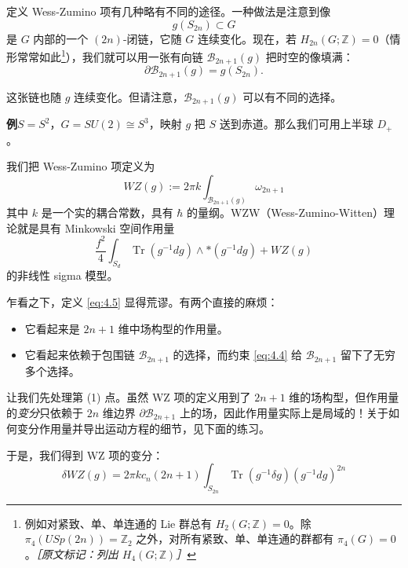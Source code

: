 定义 Wess-Zumino 项有几种略有不同的途径。一种做法是注意到像
\begin{equation}
  g(S_{2n})\subset G
  \tag{4.3}
  \label{eq:4.3}
\end{equation}
是 $G$ 内部的一个 $(2n)$-闭链，它随 $G$ 连续变化。现在，若 $H_{2n}(G;\mathbb{Z})=0$（情形常常如此\footnote{例如对紧致、单、单连通的 Lie 群总有 $H_2(G;\mathbb{Z})=0$。除 $\pi_4(USp(2n))=\mathbb{Z}_2$ 之外，对所有紧致、单、单连通的群都有 $\pi_4(G)=0$。{\small\itshape ［原文标记：列出 $H_4(G;\mathbb{Z})$］}}），我们就可以用一张有向链 $\mathcal{B}_{2n+1}(g)$ 把时空的像填满：
\begin{equation}
  \partial\mathcal{B}_{2n+1}(g)=g(S_{2n}).
  \tag{4.4}
  \label{eq:4.4}
\end{equation}

这张链也随 $g$ 连续变化。但请注意，$\mathcal{B}_{2n+1}(g)$ 可以有不同的选择。

\textbf{例}\quad $S=S^2$，$G=SU(2)\cong S^3$，映射 $g$ 把 $S$ 送到赤道。那么我们可用上半球 $D_+$。

我们把 Wess-Zumino 项定义为
\begin{equation}
  WZ(g):=2\pi k\int_{\mathcal{B}_{2n+1}(g)}\omega_{2n+1}
  \tag{4.5}
  \label{eq:4.5}
\end{equation}
其中 $k$ 是一个实的耦合常数，具有 $\hbar$ 的量纲。WZW（Wess-Zumino-Witten）理论就是具有 Minkowski 空间作用量
\begin{equation}
  \frac{f^2}{4}\int_{S_d}\operatorname{Tr}(g^{-1}dg)\wedge*(g^{-1}dg)+WZ(g)
  \tag{4.6}
  \label{eq:4.6}
\end{equation}
的非线性 sigma 模型。

乍看之下，定义 \eqref{eq:4.5} 显得荒谬。有两个直接的麻烦：
\begin{itemize}
  \item 它看起来是 $2n+1$ 维中场构型的作用量。
  \item 它看起来依赖于包围链 $\mathcal{B}_{2n+1}$ 的选择，而约束 \eqref{eq:4.4} 给 $\mathcal{B}_{2n+1}$ 留下了无穷多个选择。
\end{itemize}

让我们先处理第 (1) 点。虽然 WZ 项的定义用到了 $2n+1$ 维的场构型，但作用量的\emph{变分}只依赖于 $2n$ 维边界 $\partial\mathcal{B}_{2n+1}$ 上的场，因此作用量实际上是局域的！关于如何变分作用量并导出运动方程的细节，见下面的练习。

于是，我们得到 WZ 项的变分：
\begin{equation}
  \delta WZ(g)=2\pi kc_n(2n+1)\int_{S_{2n}}\operatorname{Tr}(g^{-1}\delta g)(g^{-1}dg)^{2n}
  \tag{4.7}
  \label{eq:4.7}
\end{equation}

